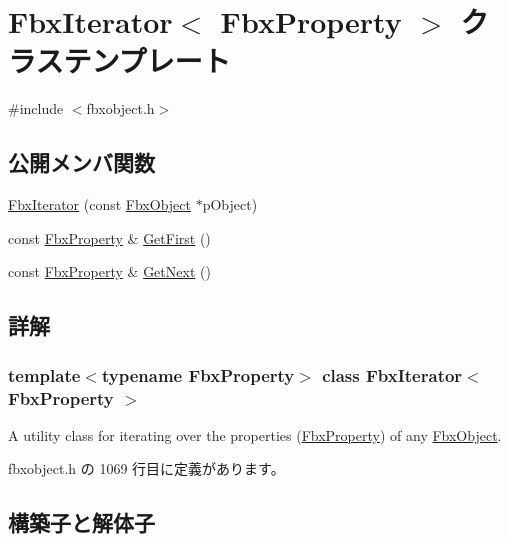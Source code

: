 \hypertarget{class_fbx_iterator}{}\section{Fbx\+Iterator$<$ Fbx\+Property $>$ クラステンプレート}
\label{class_fbx_iterator}


{\ttfamily \#include $<$fbxobject.\+h$>$}

\subsection*{公開メンバ関数}
\begin{DoxyCompactItemize}
\item 
\hyperlink{class_fbx_iterator_ab73c5a75000f53f19a1a0b8ebf662210}{Fbx\+Iterator} (const \hyperlink{class_fbx_object}{Fbx\+Object} $\ast$p\+Object)
\item 
const \hyperlink{class_fbx_property}{Fbx\+Property} \& \hyperlink{class_fbx_iterator_a3ebfa1d0238b2b13c9163a26c0687cb2}{Get\+First} ()
\item 
const \hyperlink{class_fbx_property}{Fbx\+Property} \& \hyperlink{class_fbx_iterator_a73f4bbaedea5a2f646d2195877eedd17}{Get\+Next} ()
\end{DoxyCompactItemize}


\subsection{詳解}
\subsubsection*{template$<$typename Fbx\+Property$>$\newline
class Fbx\+Iterator$<$ Fbx\+Property $>$}

A utility class for iterating over the properties (\hyperlink{class_fbx_property}{Fbx\+Property}) of any \hyperlink{class_fbx_object}{Fbx\+Object}. 

 fbxobject.\+h の 1069 行目に定義があります。



\subsection{構築子と解体子}
\mbox{\label{class_fbx_iterator_ab73c5a75000f53f19a1a0b8ebf662210}} 
